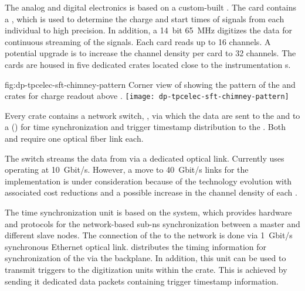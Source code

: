 The   analog and digital electronics is based on a custom-built . The card contains a   \cite{Blin:2017}, which is used to determine %
the charge and start times of signals from each individual  to high precision. In addition, a \SI{14}{bit} \SI{65}{MHz}  digitizes the data for continuous streaming of the  signals. Each card reads up to \num{16} channels. A potential %
upgrade is to increase the channel density per card to \num{32} channels. The  cards are housed in five dedicated  crates located close to the  instrumentation \fdth{}s.

\begin{dunefigure}{fig:dp-tpcelec-sft-chimney-pattern}
{Corner view of  showing the pattern of the  and  crates for charge readout above .}
\texttt{[image: dp-tpcelec-sft-chimney-pattern]}
\end{dunefigure}

Every  crate contains a network switch, , via which the data are sent to the   and to %
a () for %
time synchronization and trigger timestamp distribution to the . Both  and  require one optical fiber link each. 

The  switch streams the data from  via a dedicated optical link. Currently  uses  operating at \SI{10}{Gbit/s}. However, a move to \SI{40}{Gbit/s} links for the  implementation is under consideration because of the technology evolution with associated cost reductions and a possible increase in the channel density of each .

The  time synchronization unit is based on the  system, which provides hardware and protocols for the network-based sub-\si{\nano\s} synchronization between a master and different slave nodes. The connection of the  to the  network is done via \SI{1}{Gbit/s} synchronous Ethernet optical link.  distributes the timing information for synchronization of the  via the  backplane. In addition, this unit can be used to transmit triggers to the digitization units within the crate. This is achieved by sending it dedicated data packets containing trigger timestamp information. 

